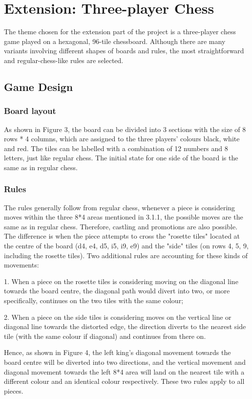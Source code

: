 \documentclass[10pt]{article}
\begin{document}
\section{Extension: Three-player Chess}
The theme chosen for the extension part of the project is a three-player chess game played on a hexagonal, 96-tile chessboard. Although there are many variants involving different shapes of boards and rules, the most straightforward and regular-chess-like rules are selected.
\subsection{Game Design}
\subsubsection{Board layout}
As shown in Figure 3, the board can be divided into 3 sections with the size of 8 rows * 4 columns, which are assigned to the three players' colours black, white and red. The tiles can be labelled with a combination of 12 numbers and 8 letters, just like regular chess. The initial state for one side of the board is the same as in regular chess.
\subsubsection{Rules}
The rules generally follow from regular chess, whenever a piece is considering moves within the three 8*4 areas mentioned in 3.1.1, the possible moves are the same as in regular chess. Therefore, castling and promotions are also possible. The difference is when the piece attempts to cross the "rosette tiles" located at the centre of the board (d4, e4, d5, i5, i9, e9) and the "side" tiles (on rows 4, 5, 9, including the rosette tiles). Two additional rules are accounting for these kinds of movements:

1. When a piece on the rosette tiles is considering moving on the diagonal line towards the board centre, the diagonal path would divert into two, or more specifically, continues on the two tiles with the same colour;

2. When a piece on the side tiles is considering moves on the vertical line or diagonal line towards the distorted edge, the direction diverts to the nearest side tile (with the same colour if diagonal) and continues from there on.

Hence, as shown in Figure 4, the left king's diagonal movement towards the board centre will be diverted into two directions, and the vertical movement and diagonal movement towards the left 8*4 area will land on the nearest tile with a different colour and an identical colour respectively. These two rules apply to all pieces.
\end{document}
